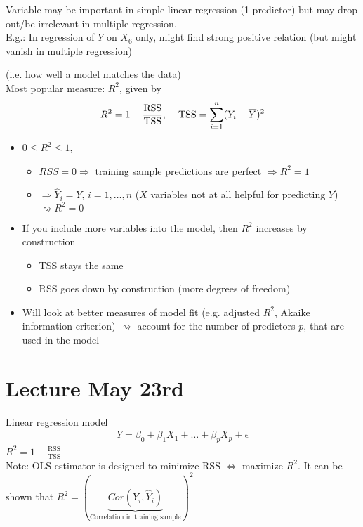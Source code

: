 \documentclass[11pt,a4paper,numbers=endperiod]{scrartcl}
\newcommand{\id}{\hspace*{4mm}}
\newcommand{\tit}[1]{\begin{large} \underline{\text{#1}}\end{large}}
\begin{document}
{\tit{Note:} Variable may be important in simple linear regression (1 predictor) but may drop out/be irrelevant in multiple regression.\\
E.g.: In regression of $Y$ on $X_6$ only, might find strong positive relation (but might vanish in multiple regression)\\
\newpage
\tit{Model fit} (i.e. how well a model matches  the data)\\
Most popular measure: $R^2$, given by \begin{align*}
	R^2 = 1 - \frac{\text{RSS}}{\text{TSS}}, \id \text{TSS} = \sum\limits_{i = 1}^n (Y_i - \overline{Y})^2
\end{align*}

\tit{Properties:} \begin{itemize}
	\item $0 \leq R^2 \leq 1$, \begin{itemize}
		\item $RSS = 0 \Rightarrow$ training sample predictions are perfect $\Rightarrow R^2 = 1$
		\item {} $\Rightarrow \hat{Y}_i = \overline{Y}$, $i = 1, \ldots, n$ ($X$ variables not at all helpful for predicting $Y$) $\rightsquigarrow R^2 = 0$
	\end{itemize} 
	\item If you include more variables into the model, then $R^2$ increases by construction
	\begin{itemize}
		\item TSS stays the same
		\item RSS goes down by construction (more degrees of freedom) 
	\end{itemize}
	\item Will look at better measures of model fit (e.g. adjusted $R^2$, Akaike information criterion) $\rightsquigarrow$ account for the number of predictors $p$, that are used in the model
\end{itemize}

\section{Lecture May 23rd} 

Linear regression model \begin{align*}
	Y = \beta_0 + \beta_1X_1 + \ldots + \beta_p X_p + \epsilon
\end{align*}
$R^2 = 1 - \frac{\text{RSS}}{\text{TSS}}$\\
Note: OLS estimator is designed to minimize RSS $\Leftrightarrow$ maximize $R^2$. It can be shown that $R^2 = (\underbrace{Cor(Y_i, \hat{Y}_i)}_{\text{Correlation in training sample}})^2$\\

}
\end{document}

